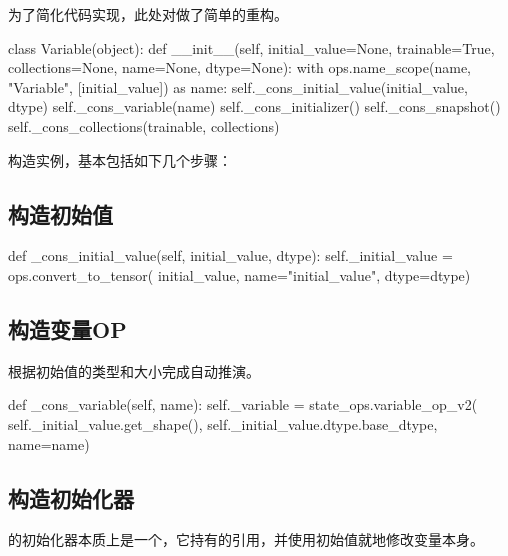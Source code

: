 \begin{content}

为了简化代码实现，此处对做了简单的重构。

\begin{leftbar}
\begin{python}
class Variable(object):
  def __init__(self, initial_value=None, trainable=True,
    collections=None, name=None, dtype=None):
    with ops.name_scope(name, "Variable", [initial_value]) as name:
      self._cons_initial_value(initial_value, dtype)
      self._cons_variable(name)
      self._cons_initializer()
      self._cons_snapshot()
    self._cons_collections(trainable, collections)
\end{python}
\end{leftbar}

构造实例，基本包括如下几个步骤：

\subsection{构造初始值}

\begin{leftbar}
\begin{python}
  def _cons_initial_value(self, initial_value, dtype):
    self._initial_value = ops.convert_to_tensor(
        initial_value, name="initial_value", dtype=dtype)
\end{python}
\end{leftbar}

\subsection{构造变量OP}

根据初始值的类型和大小完成自动推演。

\begin{leftbar}
\begin{python}
  def _cons_variable(self, name):
    self._variable = state_ops.variable_op_v2(
      self._initial_value.get_shape(),
      self._initial_value.dtype.base_dtype,
      name=name)
\end{python}
\end{leftbar}

\subsection{构造初始化器}

的初始化器本质上是一个，它持有的引用，并使用初始值就地修改变量本身。


\end{content}
